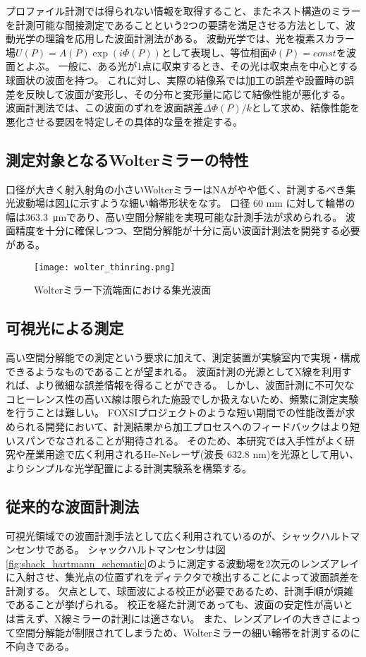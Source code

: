 プロファイル計測では得られない情報を取得すること、またネスト構造のミラーを計測可能な間接測定であることという2つの要請を満足させる方法として、波動光学の理論を応用した波面計測法がある。
波動光学では、光を複素スカラー場$U(P)=A(P)\exp(i\Phi(P))$として表現し、等位相面$\Phi(P)=const$を波面とよぶ。
一般に、ある光が1点に収束するとき、その光は収束点を中心とする球面状の波面を持つ。
これに対し、実際の結像系では加工の誤差や設置時の誤差を反映して波面が変形し、その分布と変形量に応じて結像性能が悪化する。
波面計測法では、この波面のずれを波面誤差$\Delta\Phi(P)/k$として求め、結像性能を悪化させる要因を特定しその具体的な量を推定する。

\subsection{測定対象となるWolterミラーの特性}
\label{chap1_wolter_specific_feature}

口径が大きく射入射角の小さいWolterミラーはNAがやや低く、計測するべき集光波動場は図\ref{fig:wolter_thinring}に示すような細い輪帯形状をなす。
口径 60 mm に対して輪帯の幅は\SI{363.3}{\micro \metre}であり、高い空間分解能を実現可能な計測手法が求められる。
波面精度を十分に確保しつつ、空間分解能が十分に高い波面計測法を開発する必要がある。

\begin{figure}[h!]
\centering
\texttt{[image: wolter\_thinring.png]}
\caption{Wolterミラー下流端面における集光波面}
\label{fig:wolter_thinring}
\end{figure}

\subsection{可視光による測定}
\label{chap1_visible_light_measurement}

高い空間分解能での測定という要求に加えて、測定装置が実験室内で実現・構成できるようなものであることが望まれる。
波面計測の光源としてX線を利用すれば、より微細な誤差情報を得ることができる。
しかし、波面計測に不可欠なコヒーレンス性の高いX線は限られた施設でしか扱えないため、頻繁に測定実験を行うことは難しい。
FOXSIプロジェクトのような短い期間での性能改善が求められる開発において、計測結果から加工プロセスへのフィードバックはより短いスパンでなされることが期待される。
そのため、本研究では入手性がよく研究や産業用途で広く利用されるHe-Neレーザ(波長 632.8 nm)を光源として用い、よりシンプルな光学配置による計測実験系を構築する。

\subsection{従来的な波面計測法}
\label{chap1_conventional_wave_metrics}
可視光領域での波面計測手法として広く利用されているのが、シャックハルトマンセンサである。
シャックハルトマンセンサは図\ref{fig:shack_hartmann_schematic}のように測定する波動場を2次元のレンズアレイに入射させ、集光点の位置ずれをディテクタで検出することによって波面誤差を計測する。
欠点として、球面波による校正が必要であるため、計測手順が煩雑であることが挙げられる。
校正を経た計測であっても、波面の安定性が高いとは言えず、X線ミラーの計測には適さない。
また、レンズアレイの大きさによって空間分解能が制限されてしまうため、Wolterミラーの細い輪帯を計測するのに不向きである。


